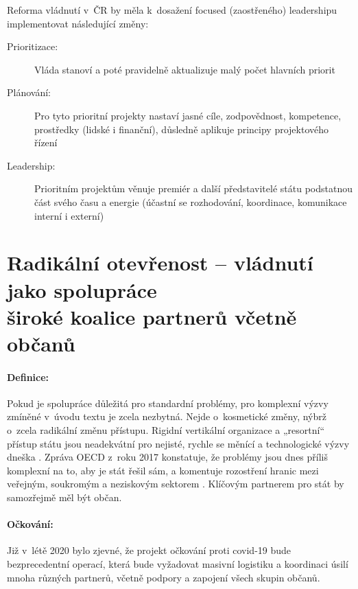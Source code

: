 Reforma vládnutí v~ČR by měla k~dosažení focused (zaostřeného) leadershipu
implementovat následující změny:
\begin{description}
  \item[Prioritizace:] Vláda stanoví a poté pravidelně aktualizuje malý počet hlavních priorit
  \item[Plánování:] Pro tyto prioritní projekty nastaví jasné cíle, zodpovědnost, kompetence, prostředky (lidské i finanční), důsledně aplikuje principy projektového řízení
  \item[Leadership:] Prioritním projektům věnuje premiér a další představitelé státu podstatnou část svého času a energie (účastní se rozhodování, koordinace, komunikace interní i externí)
\end{description}

\section*{Radikální otevřenost -- vládnutí jako spolupráce \\ široké koalice partnerů včetně občanů}

\paragraph{Definice:}Pokud je spolupráce důležitá pro standardní problémy, pro komplexní výzvy zmíněné v~úvodu textu je zcela nezbytná. Nejde o~kosmetické změny, nýbrž o~zcela radikální změnu přístupu. Rigidní vertikální organizace a „resortní“ přístup státu jsou neadekvátní pro nejisté, rychle se měnící a technologické výzvy dneška \cite{d_eggers_future_2020}. Zpráva OECD z~roku 2017 konstatuje, že problémy jsou dnes příliš komplexní na to, aby je stát řešil sám, a komentuje rozostření hranic mezi veřejným, soukromým a neziskovým sektorem \cite{oecd_public_governance_reviews_skills_2020}. Klíčovým partnerem pro stát by samozřejmě měl být občan.

\paragraph{Očkování:} Již v~létě 2020 bylo zjevné, že projekt očkování proti covid-19 bude bezprecedentní operací, která bude vyžadovat masivní logistiku a koordinaci úsilí mnoha různých partnerů, včetně podpory a zapojení všech skupin občanů.


